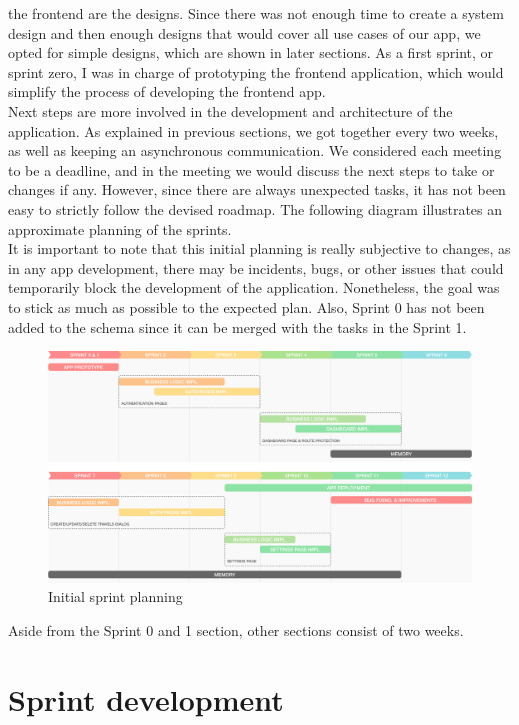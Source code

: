 \documentclass[../memory.tex]{subfiles}
\begin{document}
the frontend are the designs. Since there was not enough time to create a system
design and then enough designs that would cover all use cases of our app, we
opted for simple designs, which are shown in later sections. As a first sprint,
or sprint zero, I was in charge of prototyping the frontend application, which
would simplify the process of developing the frontend app.
\\[8pt]
Next steps are more involved in the development and architecture of the
application. As explained in previous sections, we got together every two weeks,
as well as keeping an asynchronous communication. We considered each meeting to
be a deadline, and in the meeting we would discuss the next steps to take or
changes if any. However, since there are always unexpected tasks, it has not
been easy to strictly follow the devised roadmap. The following diagram
illustrates an approximate planning of the sprints.
\\
It is important to note that this initial planning is really subjective to
changes, as in any app development, there may be incidents, bugs, or other
issues that could temporarily block the development of the application.
Nonetheless, the goal was to stick as much as possible to the expected plan.
Also, Sprint 0 has not been added to the schema since it can be merged with the
tasks in the Sprint 1.
\begin{figure}[H]
	\centering
	\includegraphics[width=\textwidth]{./assets/roadmap.png}
	\caption{Initial sprint planning}
\end{figure}
Aside from the Sprint 0 and 1 section, other sections consist of two weeks.
\section{Sprint development}
\end{document}
